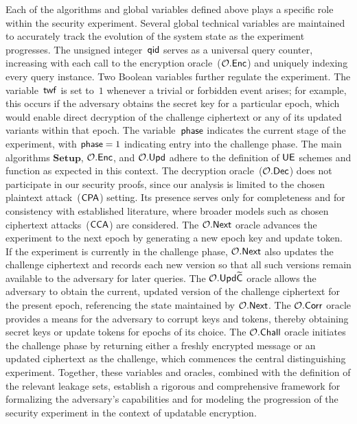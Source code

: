 \documentclass{fundam}
\begin{document}
\vspace{0.5cm}

Each of the algorithms and global variables defined above plays a specific role within the security experiment. Several global technical variables are maintained to accurately track the evolution of the system state as the experiment progresses. The unsigned integer~$\mathsf{qid}$ serves as a universal query counter, increasing with each call to the encryption oracle~($\mathcal{O}.\mathsf{Enc}$) and uniquely indexing every query instance. Two Boolean variables further regulate the experiment. The variable~$\mathsf{twf}$ is set to~$1$ whenever a trivial or forbidden event arises; for example, this occurs if the adversary obtains the secret key for a particular epoch, which would enable direct decryption of the challenge ciphertext or any of its updated variants within that epoch. The variable~$\mathsf{phase}$ indicates the current stage of the experiment, with $\mathsf{phase} = 1$ indicating entry into the challenge phase. The main algorithms $\mathbf{Setup}$, $\mathcal{O}.\mathsf{Enc}$, and $\mathcal{O}.\mathsf{Upd}$ adhere to the definition of $\mathsf{UE}$ schemes and function as expected in this context. The decryption oracle~($\mathcal{O}.\mathsf{Dec}$) does not participate in our security proofs, since our analysis is limited to the chosen plaintext attack~($\mathsf{CPA}$) setting. Its presence serves only for completeness and for consistency with established literature, where broader models such as chosen ciphertext attacks~($\mathsf{CCA}$) are considered. The $\mathcal{O}.\mathsf{Next}$ oracle advances the experiment to the next epoch by generating a new epoch key and update token. If the experiment is currently in the challenge phase, $\mathcal{O}.\mathsf{Next}$ also updates the challenge ciphertext and records each new version so that all such versions remain available to the adversary for later queries. The $\mathcal{O}.\mathsf{Upd}\widetilde{\mathsf{C}}$ oracle allows the adversary to obtain the current, updated version of the challenge ciphertext for the present epoch, referencing the state maintained by $\mathcal{O}.\mathsf{Next}$. The $\mathcal{O}.\mathsf{Corr}$ oracle provides a means for the adversary to corrupt keys and tokens, thereby obtaining secret keys or update tokens for epochs of its choice. The $\mathcal{O}.\mathsf{Chall}$ oracle initiates the challenge phase by returning either a freshly encrypted message or an updated ciphertext as the challenge, which commences the central distinguishing experiment. Together, these variables and oracles, combined with the definition of the relevant leakage sets, establish a rigorous and comprehensive framework for formalizing the adversary’s capabilities and for modeling the progression of the security experiment in the context of updatable encryption.
\end{document}
